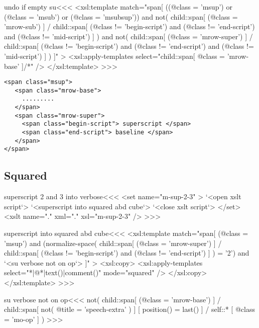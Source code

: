 \documentclass{article}
\begin{document}
\<undo if empty su\><<<
<xsl:template match="span[
    ((@class = 'msup') or (@class = 'msub')
                       or (@class = 'msubsup'))
  and
    not(
      child::span[ (@class = 'mrow-sub') ] 
        / child::span[ (@class != 'begin-script')
                       and
                       (@class != 'end-script')
                       and
                       (@class != 'mid-script')
                     ]
    )
  and
    not(
      child::span[ (@class = 'mrow-super') ] 
        / child::span[ (@class != 'begin-script')
                       and
                       (@class != 'end-script')
                       and
                       (@class != 'mid-script')
                     ]
    )
]" >
   <xsl:apply-templates select="child::span[ 
                          @class = 'mrow-base' ]/*" />
</xsl:template> 
>>>



\begin{verbatim}
<span class="msup">
   <span class="mrow-base">
     .........
   </span>
   <span class="mrow-super">
     <span class="begin-script"> superscript </span>
     <span class="end-script"> baseline </span>
   </span>
</span>
\end{verbatim}




\subsection{Squared}

\<superscript 2 and 3 into verbose\><<<
<set name="m-sup-2-3" >
  `<open xslt script`>
  `<superscript into squared abd cube`> 
  `<close xslt script`>
</set>
<xslt name="." xml="." xsl="m-sup-2-3" />
>>>

\<superscript into squared abd cube\><<<
<xsl:template match="span[
    (@class = 'msup') 
  and
    (normalize-space(
      child::span[ (@class = 'mrow-super') ] 
        / child::span[ (@class != 'begin-script')
                       and
                       (@class != 'end-script')
                     ]
     ) = '2')
  and `<su verbose not on op`>
]" >
   <xsl:copy>
      <xsl:apply-templates select="*|@*|text()|comment()" 
                           mode="squared" />
   </xsl:copy>
</xsl:template> 
>>>


\<su verbose not on op\><<<
not(
  child::span[ (@class = 'mrow-base') ] 
    / child::span[ not( @title = 'speech-extra' ) ]
                 [ position() = last() ]
    / self::* [ @class = 'mo-op' ]    
)
>>>
\end{document}
